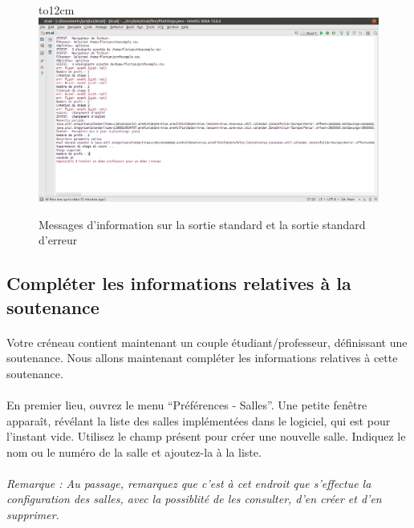 \documentclass[a4paper,10pt]{report}
\begin{document}
	~\\
	\begin{figure}[H]
	  \hbox to12cm{\hss\includegraphics[width=18cm]{../general/console.png}\hss}
	  \caption{Messages d'information sur la sortie standard et la sortie standard d'erreur }
	\end{figure}
	  
	
      \subsection{Compléter les informations relatives à la soutenance}
	\paragraph{}
	  Votre créneau contient maintenant un couple étudiant/professeur, définissant une soutenance.
	  Nous allons maintenant compléter les informations relatives à cette soutenance.
	 
	\paragraph{}
	  En premier lieu, ouvrez le menu ``Préférences - Salles''. 
	  Une petite fenêtre apparaît, révélant la liste des salles implémentées dans le logiciel, qui est pour l'instant vide.
	  Utilisez le champ présent pour créer une nouvelle salle.
	  Indiquez le nom ou le numéro de la salle et ajoutez-la à la liste.
	  
	\paragraph{}  
	  \textit{Remarque : Au passage, remarquez que c'est à cet endroit que s'effectue la configuration des salles, avec la possiblité de les consulter, d'en créer et d'en supprimer.}
	  
\end{document}
